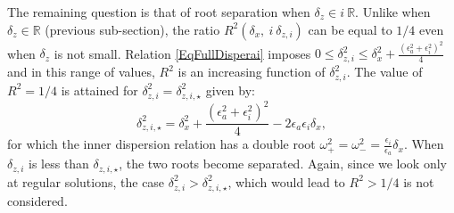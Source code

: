 \documentclass[a4paper,11pt]{article}
\begin{document}
The remaining question is that of root separation when $\delta_z\in i\ \mathbb{R}$. Unlike when $\delta_z\in \mathbb{R}$ (previous sub-section), the ratio $R^2(\delta_x,\ i\ \delta_{z,i})$ can be equal to $1/4$ even when $\delta_z$ is not small.
Relation \ref{EqFullDisperai} imposes $0\le \delta_{z,i}^2\le \delta_x^2+\frac{(\epsilon_a^2+\epsilon_i^2)^2}{4}$ and in this range of values, $R^2$ is an increasing function of $\delta_{z,i}^2$. The value of $R^2=1/4$ is attained for $\delta_{z,i}^2=\delta_{z,i,\star}^2$ given by:
%
\begin{equation}
	\delta_{z,i,\star}^2=\delta_x^2+\frac{(\epsilon_a^2+\epsilon_i^2)^2}{4}-2\epsilon_a\epsilon_i\delta_x,
	\label{deltazi}
\end{equation} 
%
for which the inner dispersion relation has a double root $\displaystyle \omega_+^2 = \omega_-^2 = \frac{\epsilon_i}{\epsilon_a}\delta_x$.
When $\delta_{z,i}$ is less than $\delta_{z,i,\star}$, the two roots become separated.
Again, since we look only at regular solutions, the case $\delta_{z,i}^2>\delta_{z,i,\star}^2$, which would lead to $R^2 > 1/4$ is not considered.
\end{document}
